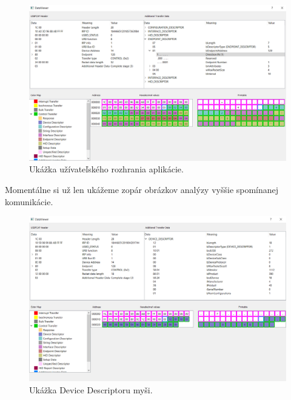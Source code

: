 \begin{figure}[!htb]
	\centering
	\includegraphics[width=\textwidth]{img/kap06_uk_popup}
	\caption{Ukážka užívateľského rozhrania aplikácie.}
	\label{obr:kap6:uk_popup}
\end{figure}

Momentálne si už len ukážeme zopár obrázkov analýzy vyššie spomínanej komunikácie.

\begin{figure}[!htb]
	\centering
	\includegraphics[width=\textwidth]{img/kap06_device_desc}
	\caption{Ukážka Device Descriptoru myši.}
	\label{obr:kap6:uk_device_desc}
\end{figure}

